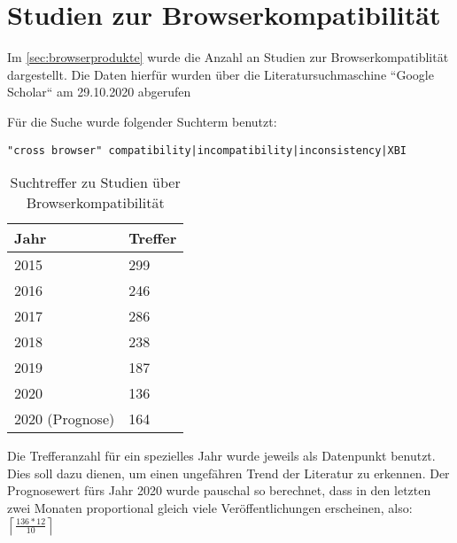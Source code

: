 \section{Studien zur Browserkompatibilität}
\label{sec:studien-zur-browser-kompatibilitaet}

Im \autoref{sec:browserprodukte} wurde die Anzahl an Studien zur Browserkompatiblität dargestellt. Die Daten hierfür wurden über die Literatursuchmaschine ``Google Scholar`` am 29.10.2020 abgerufen

Für die Suche wurde folgender Suchterm benutzt:
\begin{verbatim}
"cross browser" compatibility|incompatibility|inconsistency|XBI
\end{verbatim}

\begin{wraptable}{r}{0.4\linewidth}
\centering
\begin{tabular}{|l|l|}
  \hline
  Jahr & Treffer \\
  \hline
  2015 & 299 \\
  \hline
  2016 & 246 \\
  \hline
  2017 & 286 \\
  \hline
  2018 & 238 \\
  \hline
  2019 & 187 \\
  \hline
  2020 & 136 \\
  \hline
  2020 (Prognose) & 164 \\
  \hline
\end{tabular}
\caption{Suchtreffer zu Studien über Browserkompatibilität}
\end{wraptable}

\def\lc{\left\lceil}   
\def\rc{\right\rceil}

Die Trefferanzahl für ein spezielles Jahr wurde jeweils als Datenpunkt benutzt. Dies soll dazu dienen, um einen ungefähren Trend der Literatur zu erkennen. Der Prognosewert fürs Jahr 2020 wurde pauschal so berechnet, dass in den letzten zwei Monaten proportional gleich viele Veröffentlichungen erscheinen, also: \( \lc \frac{136 * 12}{10} \rc\ \)